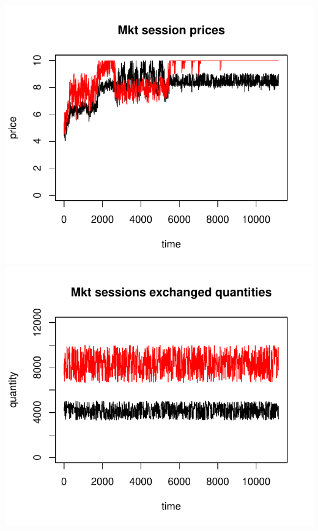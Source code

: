 \documentclass{article}
\begin{document}
\noindent
\vskip-5mm
\hskip-1cm
\includegraphics[scale=0.5]{fig_case07_prices}
\includegraphics[scale=0.5]{fig_case07_quantities}
\end{document}

